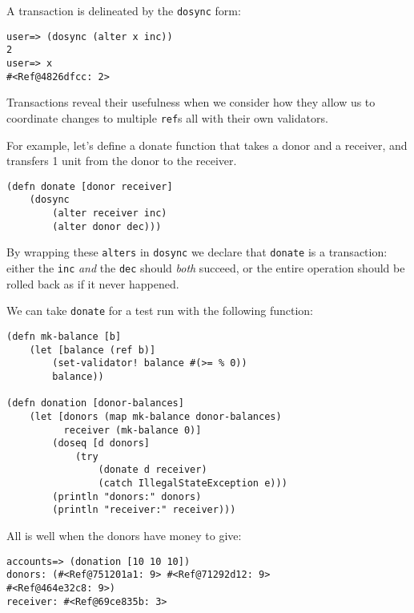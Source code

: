 \documentclass[a4paper,12pt]{kth-mag}
\begin{document}
A transaction is delineated by the \texttt{dosync} form:

\begin{listing}[H]
	\begin{verbatim}
user=> (dosync (alter x inc))
2
user=> x
#<Ref@4826dfcc: 2>
	\end{verbatim}
\end{listing}

Transactions reveal their usefulness when we consider how they allow us to coordinate changes to multiple \texttt{ref}s all with their own validators.

For example, let's define a donate function that takes a donor and a receiver, and transfers 1 unit from the donor to the receiver.

\begin{listing}[H]
	\begin{verbatim}
(defn donate [donor receiver]
    (dosync 
        (alter receiver inc)
        (alter donor dec)))
	\end{verbatim}
\end{listing}

By wrapping these \texttt{alters} in \texttt{dosync} we declare that \texttt{donate} is a transaction: either the \texttt{inc} \textit{and} the \texttt{dec} should \textit{both} succeed, or the entire operation should be rolled back as if it never happened. 

We can take \texttt{donate} for a test run with the following function:

\begin{listing}[H]
	\begin{verbatim}
(defn mk-balance [b]
    (let [balance (ref b)]
        (set-validator! balance #(>= % 0))
        balance))

(defn donation [donor-balances]
    (let [donors (map mk-balance donor-balances)
          receiver (mk-balance 0)]
        (doseq [d donors]  
            (try 
                (donate d receiver)
                (catch IllegalStateException e)))
        (println "donors:" donors)
        (println "receiver:" receiver)))
	\end{verbatim}
\end{listing}

All is well when the donors have money to give:

\begin{listing}[H]
	\begin{verbatim}
accounts=> (donation [10 10 10])
donors: (#<Ref@751201a1: 9> #<Ref@71292d12: 9> 
#<Ref@464e32c8: 9>)
receiver: #<Ref@69ce835b: 3>
	\end{verbatim}
\end{listing}
\end{document}

